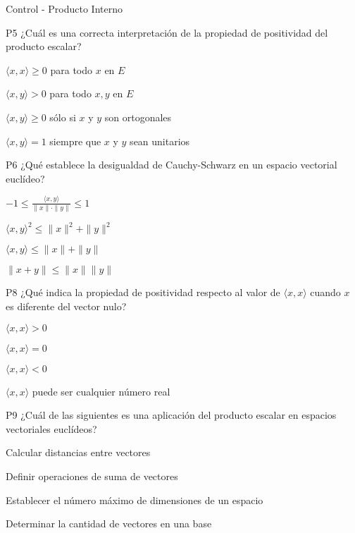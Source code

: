 \documentclass[a4,11pt]{aleph-notas}
\begin{document}
\begin{quiz}{Control - Producto Interno}
\begin{multi}[]%
    {P5}     
    ¿Cuál es una correcta interpretación de la propiedad de positividad del producto escalar?     
    \item* \(\langle x, x \rangle \geq 0\) para todo \(x\) en \(E\)     
    \item \(\langle x, y \rangle > 0\) para todo \(x, y\) en \(E\)     
    \item \(\langle x, y \rangle \geq 0\) sólo si \(x\) y \(y\) son ortogonales     
    \item \(\langle x, y \rangle = 1\) siempre que \(x\) y \(y\) sean unitarios 
\end{multi}

\begin{multi}[]%
    {P6}     
    ¿Qué establece la desigualdad de Cauchy-Schwarz en un espacio vectorial euclídeo?     
    \item* \(-1 \leq \frac{\langle x, y \rangle}{\|x\| \cdot \|y\|} \leq 1\)     
    \item \(\langle x, y \rangle^2 \leq \|x\|^2 + \|y\|^2\)     
    \item \(\langle x, y \rangle \leq \|x\| + \|y\|\)     
    \item \(\|x + y\| \leq \|x\| \|y\|\) 
\end{multi}

\begin{multi}[]%
    {P8}     
    ¿Qué indica la propiedad de positividad respecto al valor de \(\langle x, x \rangle\) cuando \(x\) es diferente del vector nulo?     
    \item* \(\langle x, x \rangle > 0\)     
    \item \(\langle x, x \rangle = 0\)     
    \item \(\langle x, x \rangle < 0\)     
    \item \(\langle x, x \rangle\) puede ser cualquier número real 
\end{multi}

\begin{multi}[]%
    {P9}     
    ¿Cuál de las siguientes es una aplicación del producto escalar en espacios vectoriales euclídeos?     
    \item* Calcular distancias entre vectores     
    \item Definir operaciones de suma de vectores     
    \item Establecer el número máximo de dimensiones de un espacio     
    \item Determinar la cantidad de vectores en una base 
\end{multi}



\end{quiz}
\end{document}
